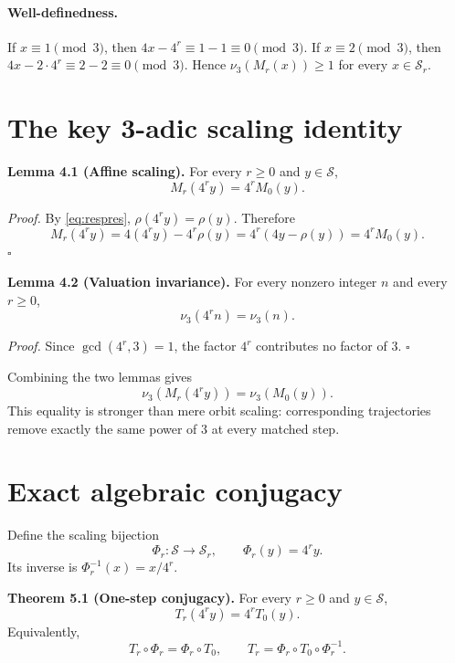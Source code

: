 \documentclass[11pt]{article}
\newcommand{\vthree}{\nu_3}
\newcommand{\Sbase}{\mathcal S}
\newcommand{\Sr}{\mathcal S_r}
\newcommand{\rhoo}{\rho}
\begin{document}
\paragraph{Well-definedness.}
If $x\equiv1\pmod3$, then $4x-4^r\equiv1-1\equiv0\pmod3$. If $x\equiv2\pmod3$, then $4x-2\cdot4^r\equiv2-2\equiv0\pmod3$. Hence $\vthree(M_r(x))\ge1$ for every $x\in\Sr$.

\section{The key 3-adic scaling identity}
\textbf{Lemma 4.1 (Affine scaling).} For every $r\ge0$ and $y\in\Sbase$,
\begin{equation}
M_r(4^r y)=4^rM_0(y).
\label{eq:affinescale}
\end{equation}

\textit{Proof.} By \eqref{eq:respres}, $\rhoo(4^r y)=\rhoo(y)$. Therefore
\[
M_r(4^r y)=4(4^r y)-4^r\rhoo(y)
=4^r(4y-\rhoo(y))=4^rM_0(y).
\]
\hfill$\square$

\textbf{Lemma 4.2 (Valuation invariance).} For every nonzero integer $n$ and every $r\ge0$,
\begin{equation}
\vthree(4^r n)=\vthree(n).
\label{eq:vinv}
\end{equation}

\textit{Proof.} Since $\gcd(4^r,3)=1$, the factor $4^r$ contributes no factor of $3$. \hfill$\square$

Combining the two lemmas gives
\begin{equation}
\vthree(M_r(4^r y))=\vthree(M_0(y)).
\label{eq:valuationsame}
\end{equation}
This equality is stronger than mere orbit scaling: corresponding trajectories remove exactly the same power of $3$ at every matched step.

\section{Exact algebraic conjugacy}
Define the scaling bijection
\begin{equation}
\Phi_r:\Sbase\to\Sr,\qquad \Phi_r(y)=4^r y.
\end{equation}
Its inverse is $\Phi_r^{-1}(x)=x/4^r$.

\textbf{Theorem 5.1 (One-step conjugacy).} For every $r\ge0$ and $y\in\Sbase$,
\begin{equation}
\boxed{T_r(4^r y)=4^rT_0(y).}
\label{eq:conjugacy}
\end{equation}
Equivalently,
\begin{equation}
T_r\circ\Phi_r=\Phi_r\circ T_0,
\qquad
T_r=\Phi_r\circ T_0\circ\Phi_r^{-1}.
\end{equation}
\end{document}
